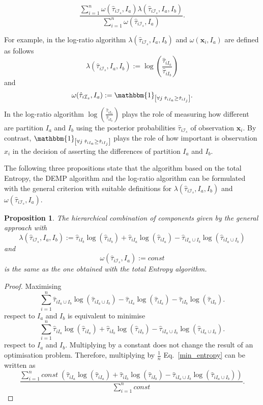 \documentclass[10pt, a4paper]{article}
\newtheorem{prop}{Proposition}
\newcommand{\m}[1]{\boldsymbol{#1}}
\begin{document}
\begin{equation}
\frac{\sum_{i=1}^n \omega(\hat{\tau}_{i \mathcal{I}_s}, I_a) \lambda(\hat{\tau}_{i \mathcal{I}_s}, I_a, I_b)}{\sum_{i=1}^n \omega(\hat{\tau}_{i \mathcal{I}_s}, I_a) }.
\end{equation}

For example, in the log-ratio algorithm $\lambda(\hat{\tau}_{i \mathcal{I}_s}, I_a, I_b)$ and $\omega(\m x_i, I_a)$ are defined as follows
\[
\lambda(\hat{\tau}_{i \mathcal{I}_s}, I_a, I_b) := \log( \frac{ \hat{\tau}_{iI_a} }{ \hat{\tau}_{iI_b} })
\]
and
\[
\omega(\hat{\tau}_{i \mathcal{I}_s}, I_a) := \mathbbm{1}_{\left[ \forall j\; \hat{\tau}_{i I_{a}} \geq \hat{\tau}_{iI_j} \right]}.
\]
In the log-ratio algorithm $\log( \frac{ \hat{\tau}_{iI_a} }{ \hat{\tau}_{iI_b} })$ plays the role of measuring how different are partition $I_a$ and $I_b$ using the posterior probabilities $\hat{\tau}_{i \mathcal{I}_s}$ of observation $\m x_i$. By contrast, $\mathbbm{1}_{\left[ \forall j\; \hat{\tau}_{i I_{a}} \geq \hat{\tau}_{iI_j} \right]}$ plays the role of how important is observation $x_i$ in the decision of asserting the differences of partition $I_a$ and $I_b$.

The following three propositions state that the algorithm based on the total Entropy, the DEMP algorithm and the log-ratio algorithm can be formulated with the general criterion with suitable definitions for $\lambda(\hat{\tau}_{i \mathcal{I}_s}, I_a, I_b)$ and $\omega(\hat{\tau}_{i \mathcal{I}_s}, I_a)$.


\begin{prop}
The hierarchical combination of components given by the general approach with
\[
\lambda(\hat{\tau}_{i \mathcal{I}_s}, I_a, I_b) := \hat{\tau}_{iI_b} \log(\hat{\tau}_{iI_b}) + \hat{\tau}_{iI_a} \log(\hat{\tau}_{iI_a}) - \hat{\tau}_{i I_a \cup I_b} \log(\hat{\tau}_{i I_a \cup I_b})
\]
and
\[
\omega(\hat{\tau}_{i \mathcal{I}_s}, I_a) := const
\]
is the same as the one obtained with the total Entropy algorithm.
\end{prop}
\begin{proof}
Maximising
\[
\sum_{i=1}^n \hat{\tau}_{i I_a \cup I_b} \log(\hat{\tau}_{i I_a \cup I_b}) - \hat{\tau}_{iI_a} \log(\hat{\tau}_{iI_a}) - \hat{\tau}_{iI_b} \log(\hat{\tau}_{iI_b}).
\]
respect to $I_a$ and $I_b$ is equivalent to minimise
\begin{equation}\label{min_entropy}
\sum_{i=1}^n \hat{\tau}_{iI_a} \log(\hat{\tau}_{iI_a}) + \hat{\tau}_{iI_b} \log(\hat{\tau}_{iI_b}) - \hat{\tau}_{i I_a \cup I_b} \log(\hat{\tau}_{i I_a \cup I_b}).
\end{equation}
respect to $I_a$ and $I_b$. Multiplying by a constant does not change the result of an optimisation problem. Therefore, multiplying by $\frac{1}{n}$ Eq.~\ref{min_entropy} can be written as
\[
\frac{\sum_{i=1}^n const \; ( \hat{\tau}_{iI_a} \log(\hat{\tau}_{iI_a}) + \hat{\tau}_{iI_b} \log(\hat{\tau}_{iI_b}) - \hat{\tau}_{i I_a \cup I_b} \log(\hat{\tau}_{i I_a \cup I_b}) )}{\sum_{i=1}^n const}.
\]
\end{proof}
\end{document}
